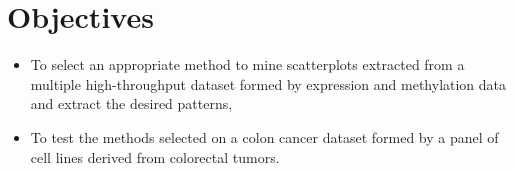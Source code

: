 \section{Objectives}

\begin{itemize}
 \item To select an appropriate
 method to mine scatterplots extracted from a multiple high-throughput dataset formed by expression and methylation data and extract the desired patterns, 
\item To test the methods selected on a
 colon cancer dataset formed by a panel of cell lines derived from
 colorectal tumors. 
\end{itemize} 
